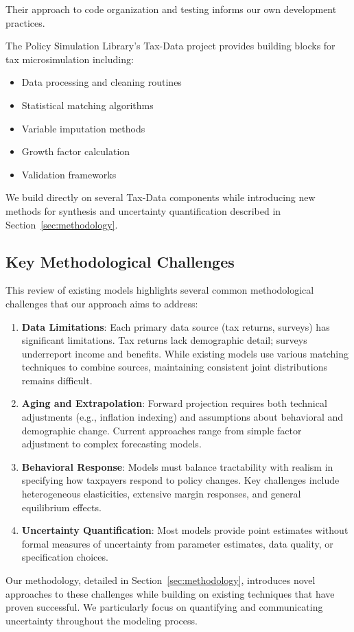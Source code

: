 Their approach to code organization and testing informs our own development practices.

The Policy Simulation Library's Tax-Data project \cite{psl2024} provides building blocks for tax microsimulation including:

\begin{itemize}
    \item Data processing and cleaning routines
    \item Statistical matching algorithms
    \item Variable imputation methods
    \item Growth factor calculation
    \item Validation frameworks
\end{itemize}

We build directly on several Tax-Data components while introducing new methods for synthesis and uncertainty quantification described in Section~\ref{sec:methodology}.

\subsection{Key Methodological Challenges}

This review of existing models highlights several common methodological challenges that our approach aims to address:

\begin{enumerate}
    \item \textbf{Data Limitations}: Each primary data source (tax returns, surveys) has significant limitations. Tax returns lack demographic detail; surveys underreport income and benefits. While existing models use various matching techniques to combine sources, maintaining consistent joint distributions remains difficult.
    
    \item \textbf{Aging and Extrapolation}: Forward projection requires both technical adjustments (e.g., inflation indexing) and assumptions about behavioral and demographic change. Current approaches range from simple factor adjustment to complex forecasting models.
    
    \item \textbf{Behavioral Response}: Models must balance tractability with realism in specifying how taxpayers respond to policy changes. Key challenges include heterogeneous elasticities, extensive margin responses, and general equilibrium effects.
    
    \item \textbf{Uncertainty Quantification}: Most models provide point estimates without formal measures of uncertainty from parameter estimates, data quality, or specification choices.
\end{enumerate}

Our methodology, detailed in Section~\ref{sec:methodology}, introduces novel approaches to these challenges while building on existing techniques that have proven successful. We particularly focus on quantifying and communicating uncertainty throughout the modeling process.